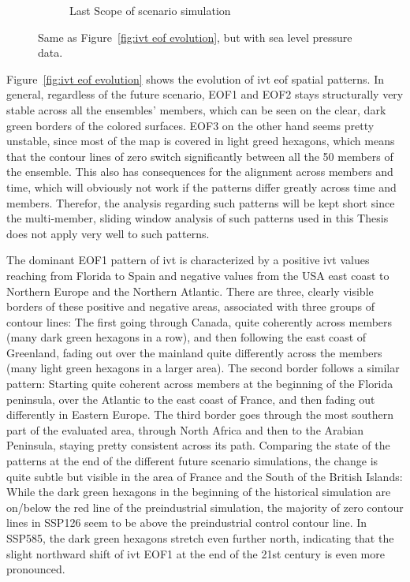 \begin{figure}[!tbp]
\begin{subfigure}[b]{0.49\textwidth}
    \caption{Last Scope of scenario simulation}
    \label{fig:psl spatial patterns endscenario}
  \end{subfigure}
  \caption{Same as Figure~\ref{fig:ivt eof evolution}, but with sea level pressure data.}\label{fig:psl eof evolution}
\end{figure}


Figure~\ref{fig:ivt eof evolution} shows the evolution of \ac{ivt} \ac{eof} spatial patterns. 
In general, regardless of the future scenario, EOF1 and EOF2 stays structurally very stable across all the ensembles' members, which can be seen on the clear, dark green borders of the colored surfaces. 
EOF3 on the other hand seems pretty unstable, since most of the map is covered in light greed hexagons, which means that the contour lines of zero switch significantly between all the 50 members of the ensemble. 
This also has consequences for the alignment across members and time, which will obviously not work if the patterns differ greatly across time and members. 
Therefor, the analysis regarding such patterns will be kept short since the multi-member, sliding window analysis of such patterns used in this Thesis does not apply very well to such patterns. 

The dominant EOF1 pattern of \ac{ivt} is characterized by a positive \ac{ivt} values reaching from Florida to Spain and negative values from the USA east coast to Northern Europe and the Northern Atlantic. 
There are three, clearly visible borders of these positive and negative areas, associated with three groups of contour lines: The first going through Canada, quite coherently across members (many dark green hexagons in a row), and then following the east coast of Greenland, fading out over the mainland quite differently across the members (many light green hexagons in a larger area). 
The second border follows a similar pattern: Starting quite coherent across members at the beginning of the Florida peninsula, over the Atlantic to the east coast of France, and then fading out differently in Eastern Europe. 
The third border goes through the most southern part of the evaluated area, through North Africa and then to the Arabian Peninsula, staying pretty consistent across its path. 
Comparing the state of the patterns at the end of the different future scenario simulations, the change is quite subtle but visible in the area of France and the South of the British Islands:
While the dark green hexagons in the beginning of the historical simulation are on/below the red line of the preindustrial simulation, the majority of zero contour lines in SSP126 seem to be above the preindustrial control contour line. 
In SSP585, the dark green hexagons stretch even further north, indicating that the slight northward shift of \ac{ivt} EOF1 at the end of the 21st century is even more pronounced. 

